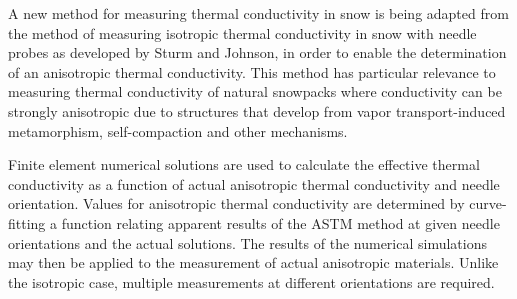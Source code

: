 A new method for measuring thermal conductivity in snow is being adapted from the method
of measuring isotropic thermal conductivity in snow with needle probes as developed by
Sturm and Johnson, in order to enable the determination of an anisotropic
thermal conductivity. \cite{sturm1,sturm2} This method has particular relevance to measuring thermal
conductivity of natural snowpacks where conductivity can be strongly anisotropic
due to structures that develop from vapor transport-induced metamorphism, self-compaction and other mechanisms.

Finite element numerical solutions are used to calculate the effective thermal
conductivity as a function of actual anisotropic thermal conductivity and needle
orientation. Values for anisotropic thermal conductivity are determined by
curve-fitting a function relating apparent results of the ASTM method at given
needle orientations and the actual solutions. The results of the numerical
simulations may then be applied to the measurement of actual anisotropic
materials. Unlike the isotropic case, multiple measurements at different
orientations are required.

